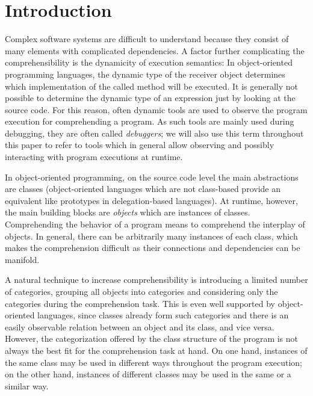 \documentclass{sig-alternate}
\begin{document}


\section{Introduction}

Complex software systems are difficult to understand because they consist of many elements with complicated dependencies.
A factor further complicating the comprehensibility is the dynamicity of execution semantics:
In object-oriented programming languages, the dynamic type of the receiver object determines which implementation of the called method will be executed.
It is generally not possible to determine the dynamic type of an expression just by looking at the source code.
For this reason, often dynamic tools are used to observe the program execution for comprehending a program.
As such tools are mainly used during debugging, they are often called \emph{debuggers};
we will also use this term throughout this paper to refer to tools which in general allow observing and possibly interacting with program executions at runtime.

In object-oriented programming, on the source code level the main abstractions are classes (object-oriented languages which are not class-based provide an equivalent like prototypes in delegation-based languages).
At runtime, however, the main building blocks are \emph{objects} which are instances of classes.
Comprehending the behavior of a program means to comprehend the interplay of objects.
In general, there can be arbitrarily many instances of each class, which makes the comprehension difficult as their connections and dependencies can be manifold.

A natural technique to increase comprehensibility is introducing a limited number of categories, grouping all objects into categories and considering only the categories during the comprehension task.
This is even well supported by object-oriented languages, since classes already form such categories and there is an easily observable relation between an object and its class, and vice versa.
However, the categorization offered by the class structure of the program is not always the best fit for the comprehension task at hand.
On one hand, instances of the same class may be used in different ways throughout the program execution; on the other hand, instances of different classes may be used in the same or a similar way.
\end{document}
